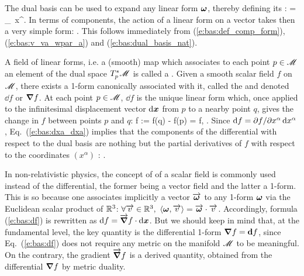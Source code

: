 The dual basis can be used to expand any linear form $\bm{\omega}$, thereby defining its
:
\be \label{e:bas:def_comp_form}
  \w{\omega} = \omega_\alpha \, \dd x^\alpha .
\ee
In terms of components, the action of a linear form on a vector takes then a very simple form:
\be
  .
\ee
This follows immediately from (\ref{e:bas:def_comp_form}),
(\ref{e:bas:v_va_wpar_a}) and (\ref{e:bas:dual_basis_nat}).

A field of linear forms, i.e. a (smooth) map which associates to each point $p\in\mathscr{M}$
an element of the dual space $T_p^*\mathscr{M}$ is called a .
Given a smooth scalar field $f$ on $\mathscr{M}$, there exists a 1-form canonically associated with it, called
the  and denoted $\dd f$ or $\bm{\nabla} f$.
At each point $p\in\mathscr{M}$, $\dd f$ is the unique linear form which, once
applied to the infinitesimal displacement vector $\mathrm{d}\bm{x}$ from $p$ to a
nearby point $q$, gives the change in $f$ between points $p$ and $q$:
\be \label{e:bas:df}
  \D f := f(q) - f(p) = \langle \dd f, \D{} \rangle .
\ee
Since $\mathrm{d} f = {\partial f}/{\partial x^\alpha} \, \mathrm{d} x^\alpha$, Eq.~(\ref{e:bas:dxa_dxa}) implies that the components of the differential with respect to the dual basis are nothing but the partial derivatives of $f$ with respect to the coordinates $(x^\alpha)$ :
\be \label{e:bas:grad_f_der_f}
   .
\ee

\begin{remark}
In non-relativistic physics, the concept of 
of a scalar field is commonly used instead of the
differential, the former being a vector field and the latter a 1-form.
This is so because one associates implicitly a vector
$\overrightarrow{\bm{\omega}}$ to any 1-form $\bm{\omega}$ via the Euclidean scalar product
of $\mathbb{R}^3$: $\forall \overrightarrow{v}\in \mathbb{R}^3,\ \langle \bm{\omega},\overrightarrow{v}\rangle = \overrightarrow{\bm{\omega}}\cdot\overrightarrow{v}$.
Accordingly, formula (\ref{e:bas:df}) is rewritten as
$\mathrm{d} f = \overrightarrow{\bm{\nabla}} f \cdot \mathrm{d}\bm{x}$. But we should keep in mind
that, at the fundamental level, the key quantity is the differential 1-form
$\bm{\nabla} f = \mathbf{d} f$, since Eq.~(\ref{e:bas:df}) does not require any metric on the
manifold $\mathscr{M}$ to be
meaningful. On the contrary, the gradient $\overrightarrow{\bm{\nabla}} f$ is a derived quantity, obtained
from the differential $\bm{\nabla} f$ by metric duality.
\end{remark}


